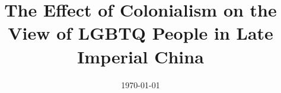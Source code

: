 \documentclass[12pt]{turabian-researchpaper}
\title{The Effect of Colonialism on the View of LGBTQ People in Late Imperial China}
\author{}
\date{\today}
\begin{document}
\begin{titlepage}
    \maketitle
\end{titlepage}



\newpage

\printbibliography
\end{document}
